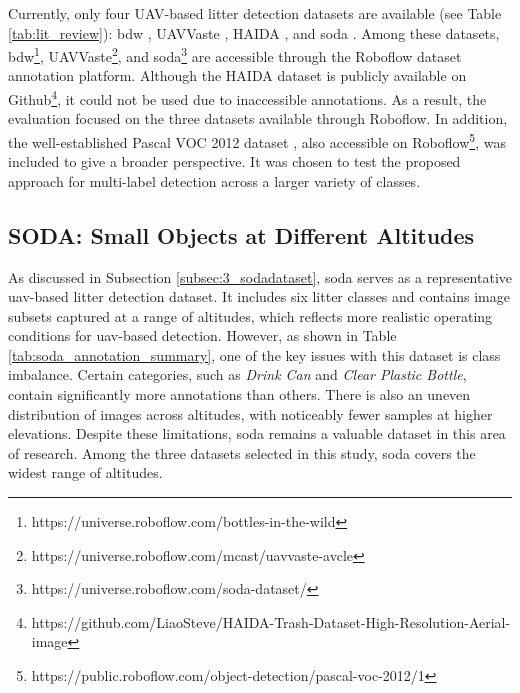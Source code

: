 Currently, only four UAV-based litter detection datasets are available (see Table \ref{tab:lit_review}): \gls{bdw} \cite{bdwdataset}, UAVVaste \cite{uavvaste}, HAIDA \cite{haida}, and \gls{soda} \cite{soda_dataset}. Among these datasets, \gls{bdw}\footnote{https://universe.roboflow.com/bottles-in-the-wild}, UAVVaste\footnote{https://universe.roboflow.com/mcast/uavvaste-avcle}, and \gls{soda}\footnote{https://universe.roboflow.com/soda-dataset/} are accessible through the Roboflow dataset annotation platform. Although the HAIDA dataset is publicly available on Github\footnote{https://github.com/LiaoSteve/HAIDA-Trash-Dataset-High-Resolution-Aerial-image}, it could not be used due to inaccessible annotations. As a result, the evaluation focused on the three datasets available through Roboflow. In addition, the well-established Pascal VOC 2012 dataset \cite{pascal-voc-2012}, also accessible on Roboflow\footnote{https://public.roboflow.com/object-detection/pascal-voc-2012/1}, was included to give a broader perspective. It was chosen to test the proposed approach for multi-label detection across a larger variety of classes.


\subsection{SODA: Small Objects at Different Altitudes}
\label{subsec:4_soda}

As discussed in Subsection \ref{subsec:3_sodadataset}, \gls{soda} serves as a representative \gls{uav}-based litter detection dataset. It includes six litter classes and contains image subsets captured at a range of altitudes, which reflects more realistic operating conditions for \gls{uav}-based detection.
However, as shown in Table \ref{tab:soda_annotation_summary}, one of the key issues with this dataset is class imbalance. Certain categories, such as \textit{Drink Can} and \textit{Clear Plastic Bottle}, contain significantly more annotations than others. There is also an uneven distribution of images across altitudes, with noticeably fewer samples at higher elevations.
Despite these limitations, \gls{soda} remains a valuable dataset in this area of research. Among the three datasets selected in this study, \gls{soda} covers the widest range of altitudes.

